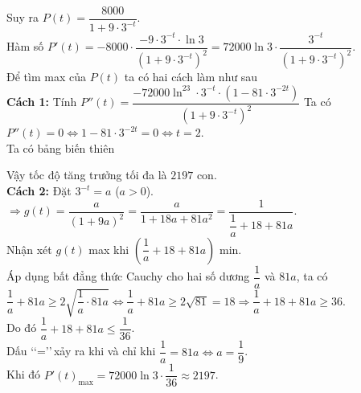 \begin{ex}
{	Suy ra $P(t)=\dfrac{8000}{1+9\cdot3^{-t}}$.\\
	Hàm số $P'(t)=-8000\cdot\dfrac{-9\cdot3^{-t}\cdot\ln3}{\left(1+9\cdot3^{-t}\right)^2}=72000\ln3\cdot\dfrac{3^{-t}}{\left(1+9\cdot3^{-t}\right)^2}$.\\
	Để tìm max của $P(t)$ ta có hai cách làm như sau\\
	\textbf{Cách 1:} Tính $P''(t)=\dfrac{-72000\ln^23\cdot3^{-t}\cdot(1-81\cdot3^{-2t})}{(1+9\cdot3^{-t})^2}$
	Ta có $P''(t)=0\Leftrightarrow1-81\cdot3^{-2t}=0\Leftrightarrow t=2$.\\
	Ta có bảng biến thiên
	\begin{center}
	\end{center}
	Vậy tốc độ tăng trưởng tối đa là $2197$ con.\\
	\textbf{Cách 2:} Đặt $3^{-t}=a$ ($a>0$).\\
	$\Rightarrow g(t)=\dfrac{a}{(1+9a)^2}=\dfrac{a}{1+18a+81a^2}=\dfrac{1}{\dfrac{1}{a}+18+81a}$.\\
	Nhận xét $g(t)$ max khi $\left(\dfrac{1}{a}+18+81a\right)$ min.\\
	Áp dụng bất đẳng thức Cauchy cho hai số dương $\dfrac{1}{a}$ và $81a$, ta có\\
	$\dfrac{1}{a}+81a\ge 2\sqrt{\dfrac{1}{a}\cdot81a}\Leftrightarrow \dfrac{1}{a}+81a\ge2\sqrt{81}=18\Rightarrow\dfrac{1}{a}+18+81a\ge36$.\\
	Do đó $\dfrac{1}{a}+18+81a\le\dfrac{1}{36}$.\\
	Dấu \lq\lq=\rq\rq\,xảy ra khi và chỉ khi $\dfrac{1}{a}=81a\Leftrightarrow a=\dfrac{1}{9}$.\\
	Khi đó $P'(t)_{\text{max}}=72000\ln3\cdot\dfrac{1}{36}\approx2197$.
	}
\end{ex}


